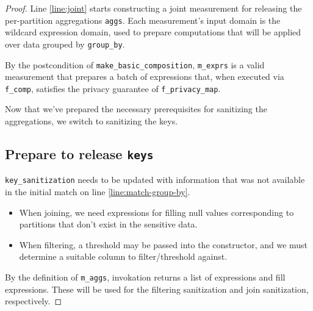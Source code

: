 \documentclass{article}
\begin{document}
\begin{proof}
Line \ref{line:joint} starts constructing a joint measurement 
for releasing the per-partition aggregations \texttt{aggs}.
Each measurement's input domain is the wildcard expression domain,
used to prepare computations that will be applied over data grouped by \texttt{group\_by}.

By the postcondition of \texttt{make\_basic\_composition}, 
\texttt{m\_exprs} is a valid measurement that prepares a batch of expressions that, 
when executed via \texttt{f\_comp}, satisfies the privacy guarantee of \texttt{f\_privacy\_map}.

Now that we've prepared the necessary prerequisites for sanitizing the aggregations,
we switch to sanitizing the keys.

\subsection{Prepare to release \texttt{keys}}
\texttt{key\_sanitization} needs to be updated with information that was not available in the initial match on line \ref{line:match-group-by}.
\begin{itemize}
    \item When joining, we need expressions for filling null values corresponding to partitions that don't exist in the sensitive data.
    \item When filtering, a threshold may be passed into the constructor, and we must determine a suitable column to filter/threshold against.
\end{itemize}

By the definition of \texttt{m\_aggs}, invokation returns a list of expressions and fill expressions.
These will be used for the filtering sanitization and join sanitization, respectively.


\end{proof}
\end{document}

